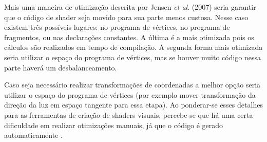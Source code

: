 Mais uma maneira de otimização descrita por Jensen \textit{et al}. (2007) seria garantir que o código de shader seja movido para sua parte menos custosa. Nesse caso existem três possíveis lugares: no programa de vértices, no programa de fragmentos, ou nas declarações constantes. A última é a mais otimizada pois os cálculos são realizados em tempo de compilação. A segunda forma mais otimizada seria utilizar o espaço do programa de vértices, mas se houver muito código nessa parte haverá um desbalanceamento.

Caso seja necessário realizar transformações de coordenadas a melhor opção seria utilizar o espaço do programa de vértices (por exemplo mover transformação da direção da luz em espaço tangente para essa etapa). Ao ponderar-se esses detalhes para as ferramentas de criação de shaders visuais, percebe-se que há uma certa dificuldade em realizar otimizações manuais, já que o código é gerado automaticamente \cite{jensen2007shader}.

	\begin{table}[h!]	
		\centering
	\end{table}

